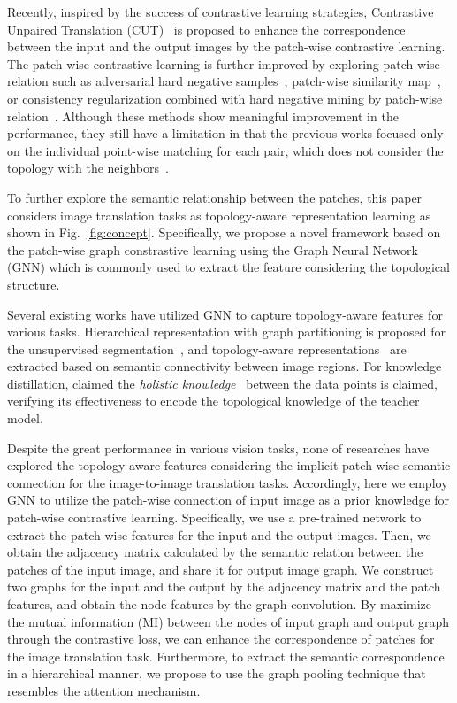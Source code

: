 \documentclass[letterpaper]{article} %
\begin{document}
Recently, inspired by the success of contrastive learning strategies, Contrastive Unpaired Translation (CUT)~\cite{cut} is proposed to enhance the correspondence between the input and the output images by the patch-wise contrastive learning. 
The patch-wise contrastive learning is further improved by exploring patch-wise relation such as adversarial hard negative samples~\cite{negcut}, patch-wise similarity map~\cite{sesim}, or consistency regularization combined with hard negative mining by patch-wise relation~\cite{HnegSRC}. Although these methods show meaningful improvement in the performance, they still have a limitation in that the previous works focused only on the individual point-wise matching for each pair, which does not consider the topology with the neighbors~\cite{hkd}. 




To further explore the semantic relationship between the patches, this paper considers   image translation tasks as topology-aware representation learning as shown in Fig.~\ref{fig:concept}.  Specifically, we propose a novel framework based on the patch-wise graph constrastive learning using the Graph Neural Network (GNN) which is commonly used to extract the feature considering the topological structure. 

Several existing works have utilized GNN to capture topology-aware features for various tasks. Hierarchical representation with graph partitioning is proposed for the unsupervised segmentation~\cite{deepSpectral,tokenCut}, and topology-aware representations~\cite{visionGNN} are extracted based on semantic connectivity between image regions. For knowledge distillation, claimed the {\em holistic knowledge}~\cite{hkd} between the data points is claimed, verifying its effectiveness to encode the topological knowledge of the teacher model.

Despite the great performance in various vision tasks,
none of researches have explored the topology-aware features considering the implicit patch-wise semantic connection for the image-to-image translation tasks. 
Accordingly, here we employ GNN to utilize the patch-wise connection of input image as a prior knowledge for patch-wise contrastive learning. 
Specifically, we  use a pre-trained network to extract the patch-wise features for the input and the output images. Then, we obtain the adjacency matrix calculated by the semantic relation between the patches of the input image, and share it for output image graph. We construct two graphs for the input and the output by the adjacency matrix and the patch features, and obtain the node features by the graph convolution. By maximize the mutual information (MI) between the nodes of input graph and output graph through the contrastive loss, we can enhance the correspondence of patches for the image translation task. 
Furthermore, to extract the semantic correspondence in a hierarchical manner,
we propose to use the graph pooling technique that resembles the attention mechanism. %
\end{document}
